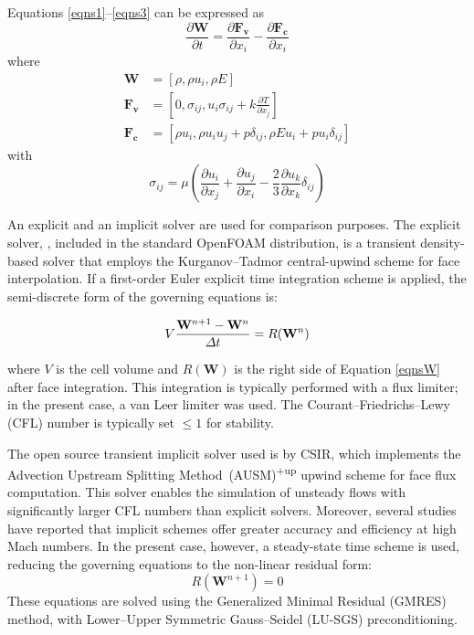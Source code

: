 \documentclass[
    parskip=half,      %
    DIV=12,            %
    headings=normal,   %
    fontsize=11pt,     %
    english            %
]{scrartcl}
\begin{document}
 {Equations \eqref{eqns1}--\eqref{eqns3} can be expressed as
 	\begin{equation}\label{eqnsW}
 		\dfrac{\partial \mathbf{W}}{\partial t} = \frac{\partial \mathbf{F_v}}{\partial x_i} 
 		- \frac{\partial \mathbf{F_c}}{\partial x_i} 
 	\end{equation}
 	where
 	\begin{align}
 		\mathbf{W}& = [\rho,\rho u_i,\rho E]
 		\\
 		\mathbf{F_v}& = [0,\sigma_{ij},u_i\sigma_{ij}+k\frac{\partial T}{\partial x_j}]
 		\\
 		\mathbf{F_c}& = [\rho u_i, \rho u_i u_j + p\delta_{ij},\rho E u_i + p u_i \delta_{ij}]
 	\end{align}
 	with
 	\begin{equation}\label{key}
 		\sigma_{ij} = \mu 
 		\left( \dfrac{\partial u_i}{\partial x_j} + \dfrac{\partial u_j}{\partial x_i} 
 		- \frac{2}{3} \frac{\partial u_k}{\partial x_k}\delta_{ij} \right)
 	\end{equation}
 }
 
 An explicit and an implicit solver are used for comparison purposes.  
 The explicit solver, , included in the standard {OpenFOAM} distribution, is a transient density-based solver that employs the Kurganov–Tadmor central-upwind scheme for face interpolation.  
 If a first-order Euler explicit time integration scheme is applied, the semi-discrete form of the governing equations is:
 
 \begin{equation}\label{eq:EulerTS}
 	V \frac{\mathbf{W}^{n+1}-\mathbf{W}^{n}}{\mathnormal{\Delta}
 		t} = R(\mathbf{W}^{n})
 \end{equation}
 
 where $V$ is the cell volume and $R(\mathbf{W})$ is the right side of Equation \eqref{eqnsW} after face integration. 
 This integration is typically performed with a flux limiter; in the present case, a van Leer limiter was used.   
 The Courant–Friedrichs–Lewy (CFL) number is typically set $\leq 1$ for stability. 
 
 The open source transient implicit solver used is
  \href{https://hisa.gitlab.io/}{} by CSIR, which implements the Advection Upstream Splitting Method~(AUSM)\textsuperscript{+up} upwind scheme for face flux computation.  
 This solver enables the simulation of unsteady flows with significantly larger CFL numbers than explicit solvers. Moreover, several studies have reported that implicit schemes offer greater accuracy and efficiency at high Mach numbers.
 In the present case, however, a steady-state time scheme is used, reducing the governing equations to the non-linear residual form:
 \begin{equation}\label{eq:steadyEqns}
 	R(\mathbf{W}^{n+1}) = 0
 \end{equation}
 These equations are solved using the Generalized Minimal Residual (GMRES) method, with Lower–Upper Symmetric Gauss–Seidel (LU-SGS) preconditioning.
 
\end{document}

